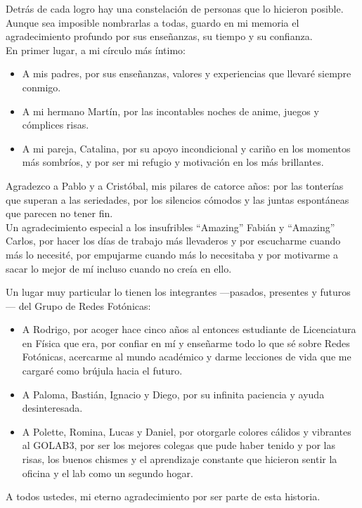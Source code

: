 \documentclass[hyphens]{umemoria}
\begin{document}
\begin{thanks}
Detrás de cada logro hay una constelación de personas que lo hicieron posible. Aunque sea imposible nombrarlas a todas, guardo en mi memoria el agradecimiento profundo por sus enseñanzas, su tiempo y su confianza. \\

En primer lugar, a mi círculo más íntimo:
\begin{itemize}
\item A mis padres, por sus enseñanzas, valores y experiencias que llevaré siempre conmigo.
\item A mi hermano Martín, por las incontables noches de anime, juegos y cómplices risas.
\item A mi pareja, Catalina, por su apoyo incondicional y cariño en los momentos más sombríos, y por ser mi refugio y motivación en los más brillantes.
\end{itemize}
Agradezco a Pablo y a Cristóbal, mis pilares de catorce años: por las tonterías que superan a las seriedades, por los silencios cómodos y las juntas espontáneas que parecen no tener fin. \\
Un agradecimiento especial a los insufribles ``Amazing'' Fabián y ``Amazing'' Carlos, por hacer los días de trabajo más llevaderos y por escucharme cuando más lo necesité, por empujarme cuando más lo necesitaba y por motivarme a sacar lo mejor de mí incluso cuando no creía en ello.

Un lugar muy particular lo tienen los integrantes —pasados, presentes y futuros— del Grupo de Redes Fotónicas:
\begin{itemize}
\item A Rodrigo, por acoger hace cinco años al entonces estudiante de Licenciatura en Física que era, por confiar en mí y enseñarme todo lo que sé sobre Redes Fotónicas, acercarme al mundo académico y darme lecciones de vida que me cargaré como brújula hacia el futuro.
\item A Paloma, Bastián, Ignacio y Diego, por su infinita paciencia y ayuda desinteresada.
\item A Polette, Romina, Lucas y Daniel, por otorgarle colores cálidos y vibrantes al GOLAB3, por ser los mejores colegas que pude haber tenido y por las risas, los buenos chismes y el aprendizaje constante que hicieron sentir la oficina y el lab como un segundo hogar.
\end{itemize}
A todos ustedes, mi eterno agradecimiento por ser parte de esta historia.
\end{thanks}
\end{document}
